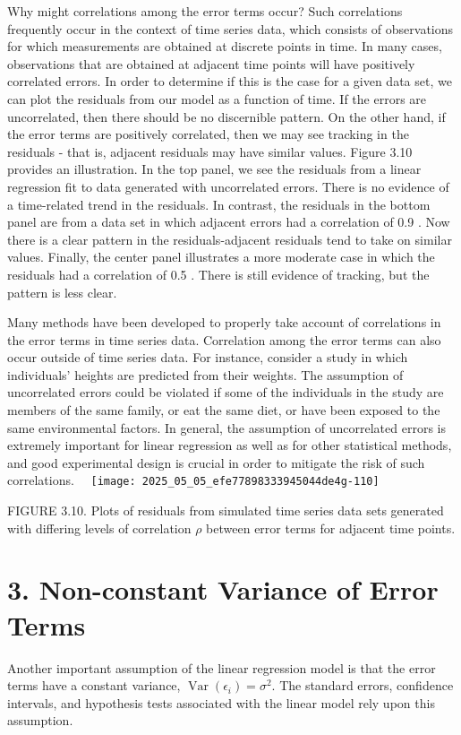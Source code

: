\documentclass[10pt]{article}
\begin{document}
Why might correlations among the error terms occur? Such correlations frequently occur in the context of time series data, which consists of observations for which measurements are obtained at discrete points in time. In many cases, observations that are obtained at adjacent time points will have positively correlated errors. In order to determine if this is the case for a given data set, we can plot the residuals from our model as a function of time. If the errors are uncorrelated, then there should be no discernible pattern. On the other hand, if the error terms are positively correlated, then we may see tracking in the residuals - that is, adjacent residuals may have similar values. Figure 3.10 provides an illustration. In the top panel, we see the residuals from a linear regression fit to data generated with uncorrelated errors. There is no evidence of a time-related trend in the residuals. In contrast, the residuals in the bottom panel are from a data set in which adjacent errors had a correlation of 0.9 . Now there is a clear pattern in the residuals-adjacent residuals tend to take on similar values. Finally, the center panel illustrates a more moderate case in which the residuals had a correlation of 0.5 . There is still evidence of tracking, but the pattern is less clear.

Many methods have been developed to properly take account of correlations in the error terms in time series data. Correlation among the error terms can also occur outside of time series data. For instance, consider a study in which individuals' heights are predicted from their weights. The assumption of uncorrelated errors could be violated if some of the individuals in the study are members of the same family, or eat the same diet, or have been exposed to the same environmental factors. In general, the assumption of uncorrelated errors is extremely important for linear regression as well as for other statistical methods, and good experimental design is crucial in order to mitigate the risk of such correlations.\
\
\texttt{[image: 2025\_05\_05\_efe77898333945044de4g-110]}

FIGURE 3.10. Plots of residuals from simulated time series data sets generated with differing levels of correlation $\rho$ between error terms for adjacent time points.

\section*{3. Non-constant Variance of Error Terms}
Another important assumption of the linear regression model is that the error terms have a constant variance, $\operatorname{Var}\left(\epsilon_{i}\right)=\sigma^{2}$. The standard errors, confidence intervals, and hypothesis tests associated with the linear model rely upon this assumption.
\end{document}
